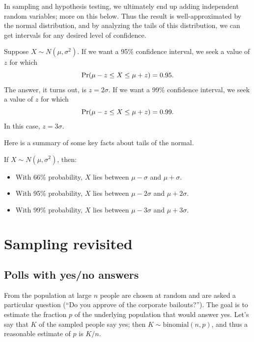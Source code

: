 In sampling and hypothesis testing, we ultimately end up adding independent random
variables; more on this below. Thus the result is well-approximated by the normal
distribution, and by analyzing the tails of this distribution, we can get 
intervals for any desired level of confidence.

Suppose $X \sim N(\mu,\sigma^2)$. If we want a 95\% confidence interval, we seek a 
value of $z$ for which 
$$ \mbox{\rm Pr}(\mu-z \leq X \leq \mu+z) = 0.95 .$$
The answer, it turns out, is $z = 2 \sigma$. If we want a 99\% confidence interval, we
seek a value of $z$ for which
$$ \mbox{\rm Pr}(\mu-z \leq X \leq \mu+z) = 0.99 .$$
In this case, $z = 3 \sigma$.

Here is a summary of some key facts about tails of the normal.
\begin{fact}
If $X \sim N(\mu, \sigma^2)$, then:
\begin{itemize}
\item With 66\% probability, $X$ lies between $\mu-\sigma$ and $\mu+\sigma$.
\item With 95\% probability, $X$ lies between $\mu-2\sigma$ and $\mu+2\sigma$.
\item With 99\% probability, $X$ lies between $\mu-3\sigma$ and $\mu+3\sigma$.
\end{itemize}
\label{fact:normal-tails}
\end{fact}

\section{Sampling revisited}

\subsection{Polls with yes/no answers}

From the population at large $n$ people are chosen at random and are asked a particular
question (``Do you approve of the corporate bailouts?''). The goal is to estimate 
the fraction $p$ of the underlying population that would answer yes. Let's say
that $K$ of the sampled people say yes; then $K \sim \mbox{binomial}(n,p)$, and
thus a reasonable estimate of $p$ is $K/n$.

